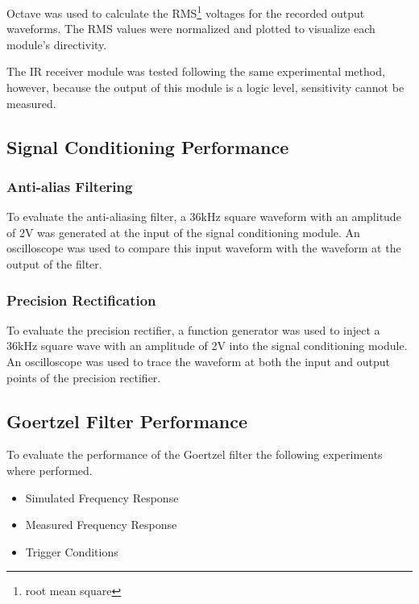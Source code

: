 Octave was used to calculate the RMS\footnote{root mean square} voltages for the recorded output waveforms. The RMS values were normalized and plotted to visualize each module's directivity.

The IR receiver module was tested following the same experimental method, however, because the output of this module is a logic level, sensitivity cannot be measured.






\subsection{Signal Conditioning Performance}

\subsubsection{Anti-alias Filtering}
To evaluate the anti-aliasing filter, a 36kHz square waveform with an amplitude of 2V was generated at the input of the signal conditioning module. An oscilloscope was used to compare this input waveform with the waveform at the output of the filter.

\subsubsection{Precision Rectification}
To evaluate the precision rectifier, a function generator was used to inject a 36kHz square wave with an amplitude of 2V into the signal conditioning module. An oscilloscope was used to trace the waveform at both the input and output points of the precision rectifier.






\subsection{Goertzel Filter Performance}

To evaluate the performance of the Goertzel filter the following experiments where performed.

\begin{itemize}
	\item Simulated Frequency Response
	\item Measured Frequency Response
	\item Trigger Conditions
\end{itemize}

